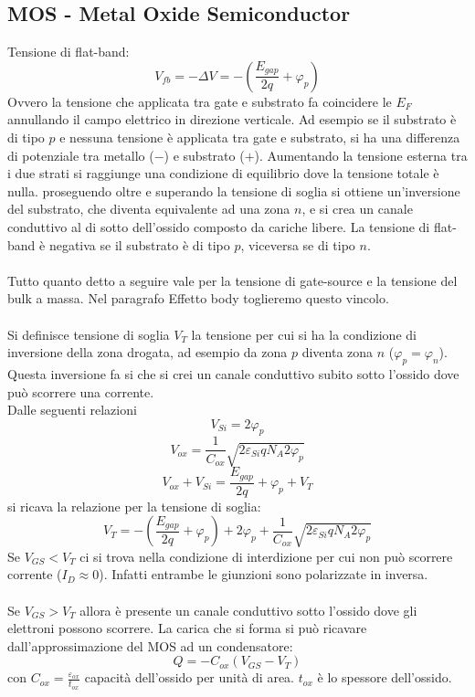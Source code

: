 \documentclass{article}
\begin{document}
\subsection*{MOS - Metal Oxide Semiconductor}
Tensione di flat-band:
\begin{equation*}
V_{fb} = -\Delta V = - \left( \frac{E_{gap}}{2q} + \varphi_p \right)
\end{equation*}
Ovvero la tensione che applicata tra gate e substrato fa coincidere le $E_F$ annullando il campo elettrico in direzione verticale. Ad esempio se il substrato è di tipo $p$ e nessuna tensione è applicata tra gate e substrato, si ha una differenza di potenziale tra metallo ($-$) e substrato ($+$). Aumentando la tensione esterna tra i due strati si raggiunge una condizione di equilibrio dove la tensione totale è nulla. proseguendo oltre e superando la tensione di soglia si ottiene un'inversione del substrato, che diventa equivalente ad una zona $n$, e si crea un canale conduttivo al di sotto dell'ossido composto da cariche libere. La tensione di flat-band è negativa se il substrato è di tipo $p$, viceversa se di tipo $n$.\\
\\
Tutto quanto detto a seguire vale per la tensione di gate-source e la tensione del bulk a massa. Nel paragrafo Effetto body toglieremo questo vincolo.\\
\\
Si definisce tensione di soglia $V_T$ la tensione per cui si ha la condizione di inversione della zona drogata, ad esempio da zona $p$ diventa zona $n$ ($\varphi_p = \varphi_n$). Questa inversione fa si che si crei un canale conduttivo subito sotto l'ossido dove può scorrere una corrente.\\
Dalle seguenti relazioni
\begin{equation*}
V_{Si} = 2\varphi_p
\end{equation*}
\begin{equation*}
V_{ox} = \frac{1}{C_{ox}} \sqrt{2\varepsilon_{Si} q N_A 2\varphi_p}
\end{equation*}
\begin{equation*}
V_{ox} + V_{Si} = \frac{E_{gap}}{2q} + \varphi_p + V_T
\end{equation*}
si ricava la relazione per la tensione di soglia:
\begin{equation*}
V_T = -\left( \frac{E_{gap}}{2q} + \varphi_p \right) + 2\varphi_p + \frac{1}{C_{ox}}\sqrt{2\varepsilon_{Si} q N_A 2\varphi_p}
\end{equation*}
Se $V_{GS} < V_T$ ci si trova nella condizione di interdizione per cui non può scorrere corrente ($I_D \approx 0$). Infatti entrambe le giunzioni sono polarizzate in inversa.\\
\\
Se $V_{GS} > V_T$ allora è presente un canale conduttivo sotto l'ossido dove gli elettroni possono scorrere. La carica che si forma si può ricavare dall'approssimazione del MOS ad un condensatore:
\begin{equation*}
Q = -C_{ox} (V_{GS} - V_T)
\end{equation*}
con $C_{ox} = \frac{\varepsilon_{ox}}{t_{ox}}$ capacità dell'ossido per unità di area. $t_{ox}$ è lo spessore dell'ossido.
\end{document}
